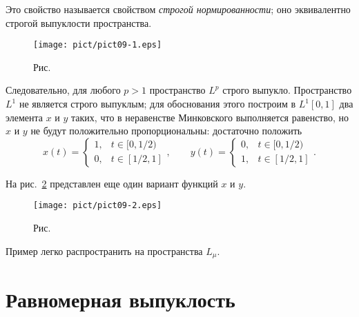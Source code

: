  Это свойство называется свойством {\it строгой
  нормированности}; оно эквивалентно строгой выпуклости пространства.

  \begin{figure}[ht]
\begin{center}
\texttt{[image: pict/pict09-1.eps]}
\end{center}
 \bigskip
 \label{r9-1}

 \centerline{Рис.~\theris}
 \bigskip
\end{figure}


 Следовательно, для любого $p>1$ пространство ${L^p}$ строго выпукло. Пространство ${L^1}$
 не является строго выпуклым; для обоснования этого построим в ${L^1}[0,1]$
  два элемента $x$ и $y$ таких, что в неравенстве Минковского
  {выполняется равенство}, но $x$ и $y$ не будут положительно пропорциональны:
  {достаточно положить}
  $$
    {
    x(t) = \begin{cases}
      1, & t \in [0,1/2)  \\[7pt]
      0, & t \in [1/2,1]
    \end{cases},\qquad
    y(t) = \begin{cases}
      0, & t \in [0,1/2)  \\[7pt]
      1, & t \in [1/2,1]
    \end{cases}.}
  $$

 На рис.~\ref{r9-2} представлен еще один вариант функций
 $x$ и $y.$

 \bigskip
\begin{figure}[ht]
\begin{center}
\texttt{[image: pict/pict09-2.eps]}
\end{center}
 \bigskip
 \label{r9-2}

 \centerline{Рис.~\theris}
 \bigskip
\end{figure}

 Пример легко распространить на пространства $L_{\mu}.$


 \section{Равномерная выпуклость}

